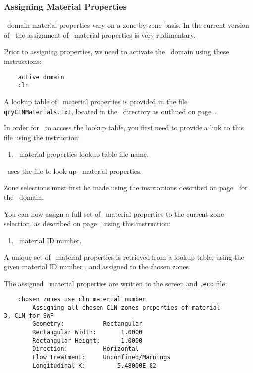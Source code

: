 \subsubsection{Assigning Material Properties}  
\cln\ domain material properties vary on a zone-by-zone basis.  In the current version of \mut\, the assignment of \cln\ material properties is very rudimentary.

Prior to assigning properties, we need to activate the \cln\ domain using these instructions:
\begin{verbatim}
    active domain
    cln
\end{verbatim}

A lookup table of \cln\ material properties  is provided in the file \texttt{qryCLNMaterials.txt}, located in the \bin\ directory as outlined on page~\pageref{page:userbin}.

In order for \mut\ to access the lookup table, you first need to provide a link to this file using the instruction:

    {
        \squish
        \begin{enumerate}
        \item {}  \cln\ material properties lookup table file name.
        \end{enumerate}
          \mut\ uses the file  to look up \cln\ material properties.
    }

Zone selections must first be made using the instructions described on page~\pageref{page:zoneSelect} for the \gwf\ domain.

You can now assign a full set of \cln\ material properties to the current zone selection, as described on page~\pageref{page:zoneSelect}, using this instruction:

    {
        \squish
        \begin{enumerate}
        \item {}  \cln\ material ID number.
        \end{enumerate}
          A unique set of \cln\ material properties is retrieved from a lookup table, using the given  material ID number , and assigned to the chosen zones.
    }

The assigned \cln\ material properties are written to the screen and \texttt{.eco} file:
\begin{verbatim}
    chosen zones use cln material number
    	Assigning all chosen CLN zones properties of material               3, CLN_for_SWF
    	Geometry:           Rectangular
    	Rectangular Width:       1.0000
    	Rectangular Height:      1.0000
    	Direction:          Horizontal
    	Flow Treatment:     Unconfined/Mannings
    	Longitudinal K:         5.48000E-02
\end{verbatim}

